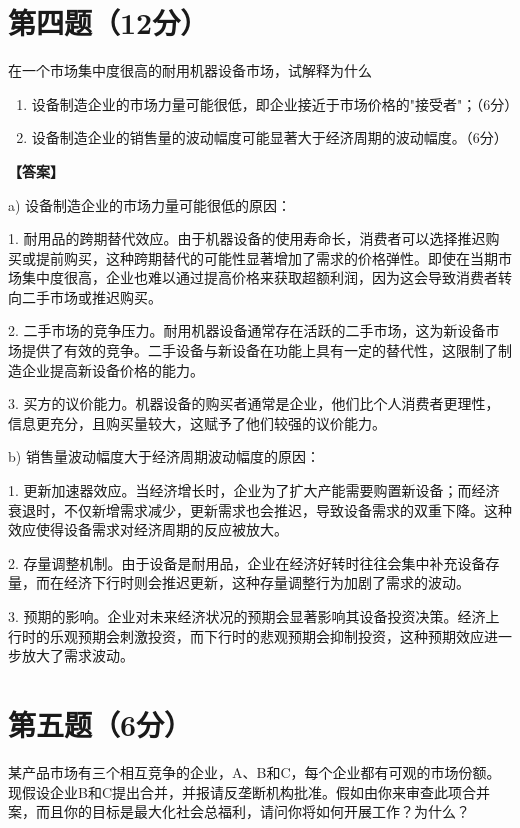 \documentclass[12pt]{article}
\begin{document}
\section*{第四题（12分）}
在一个市场集中度很高的耐用机器设备市场，试解释为什么

\begin{enumerate}
\item 设备制造企业的市场力量可能很低，即企业接近于市场价格的"接受者"；（6分）

\item 设备制造企业的销售量的波动幅度可能显著大于经济周期的波动幅度。（6分）
\end{enumerate}

\noindent\textbf{【答案】}

a) 设备制造企业的市场力量可能很低的原因：

1. 耐用品的跨期替代效应。由于机器设备的使用寿命长，消费者可以选择推迟购买或提前购买，这种跨期替代的可能性显著增加了需求的价格弹性。即使在当期市场集中度很高，企业也难以通过提高价格来获取超额利润，因为这会导致消费者转向二手市场或推迟购买。

2. 二手市场的竞争压力。耐用机器设备通常存在活跃的二手市场，这为新设备市场提供了有效的竞争。二手设备与新设备在功能上具有一定的替代性，这限制了制造企业提高新设备价格的能力。

3. 买方的议价能力。机器设备的购买者通常是企业，他们比个人消费者更理性，信息更充分，且购买量较大，这赋予了他们较强的议价能力。

b) 销售量波动幅度大于经济周期波动幅度的原因：

1. 更新加速器效应。当经济增长时，企业为了扩大产能需要购置新设备；而经济衰退时，不仅新增需求减少，更新需求也会推迟，导致设备需求的双重下降。这种效应使得设备需求对经济周期的反应被放大。

2. 存量调整机制。由于设备是耐用品，企业在经济好转时往往会集中补充设备存量，而在经济下行时则会推迟更新，这种存量调整行为加剧了需求的波动。

3. 预期的影响。企业对未来经济状况的预期会显著影响其设备投资决策。经济上行时的乐观预期会刺激投资，而下行时的悲观预期会抑制投资，这种预期效应进一步放大了需求波动。

\section*{第五题（6分）}
某产品市场有三个相互竞争的企业，A、B和C，每个企业都有可观的市场份额。现假设企业B和C提出合并，并报请反垄断机构批准。假如由你来审查此项合并案，而且你的目标是最大化社会总福利，请问你将如何开展工作？为什么？
\end{document}

